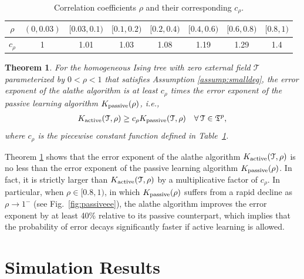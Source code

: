 \documentclass[11pt,onecolumn]{article}
\newcommand{\calT}{\mathcal{T}}
\newcommand{\frakT}{\mathfrak{T}}
\newtheorem{theorem}{Theorem}
\newcommand{\Passive}{{\rm passive}}
\newcommand{\Active}{{\rm active}}
\begin{document}
\begin{table}[t]
	\normalsize
	\centering
	\begin{tabular}{|c|c|c|c|c|c|c|c|}
	\hline
	$\rho$ & $(0,0.03)$ & $[0.03,0.1)$ & $[0.1,0.2)$ & $[0.2,0.4)$ & $[0.4,0.6)$ & $[0.6,0.8)$ & $[0.8,1)$\\
	\hline
	$c_{\rho}$ & 1 & 1.01 & 1.03 & 1.08 & 1.19& 1.29 & 1.4 \\
	\hline
	\end{tabular}
	\caption{Correlation coefficients $\rho$ and their corresponding $c_{\rho}$.}
	\label{table:crho}
\end{table}

\begin{theorem}\label{thm:mainthem}
	For the homogeneous Ising tree with zero external field $\calT$ parameterized by $0<\rho<1$ that satisfies Assumption \ref{assump:smalldeg}, the error exponent of the \ac{alathe} algorithm is at least $c_{\rho}$ times the 
	error exponent of the passive learning algorithm $K _{\Passive}(\rho)$, i.e.,
	\begin{align}
		K _{\Active}(\calT,\rho)\geq c_{\rho}K _{\Passive}(\calT,\rho) \quad \forall\, \calT\in\frakT^{p},
	\end{align}
	where $c_{\rho}$ is the piecewise constant function   defined in Table~\ref{table:crho}.
\end{theorem} 
Theorem \ref{thm:mainthem} shows that the error exponent of the \ac{alathe} algorithm $K _{\Active}(\calT,\rho)$ is no less than the error exponent of the passive learning algorithm $K _{\Passive}(\rho)$. In fact, it is strictly larger than $K _{\Active}(\calT,\rho)$ by a multiplicative factor of $c_{\rho}$. In particular, when 
$\rho\in[0.8,1)$, in which $K _{\Passive}(\rho)$ suffers from a rapid decline as $\rho\to 1^-$ (see Fig.~\ref{fig:passiveee}), the \ac{alathe} algorithm improves the error exponent by at least 40\% relative to  its passive counterpart, which implies that the probability of error decays significantly faster if active learning is allowed. 

\section{Simulation Results} \label{sec:sim}
\end{document}
